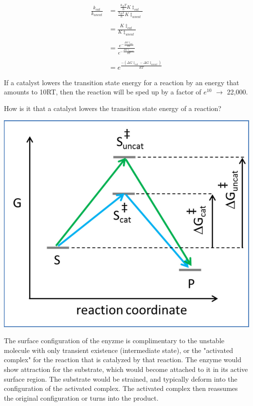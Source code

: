 \documentclass[12pt, letterpaper]{article}
\begin{document}
\begin{align*}
    \frac{k_{cat}}{k_{uncat}} &= \frac{\frac{k_BT}{h}K\ddagger_{cat}}{\frac{k_BT}{h}K\ddagger_{uncat}} \\ \\ 
    &= \frac{K\ddagger_{cat}}{K\ddagger_{uncat}} \\ \\ 
    &= \frac{e^{-\frac{\Delta G \ddagger_{cat}}{RT}}}{e^{-\frac{\Delta G \ddagger_{uncat}}{RT}}} \\ \\ 
    &= e^{\frac{-(\Delta G \ddagger_{cat} - \Delta G \ddagger_{uncat})}{RT}}
\end{align*}

If a catalyst lowers the transition state energy for a reaction by an energy that amounts to 10RT, then the reaction 
will be sped up by a factor of $e^{10}$ $\rightarrow$ 22,000. 

How is it that a catalyst lowers the transition state energy of a reaction? 
\begin{center}
    \includegraphics[scale = 0.5]{Catalysis .png}
\end{center}
\newpage


The surface configuration of the enyzme is complimentary to the unstable molecule with only transient existence (intermediate state), 
or the "activated complex" for the reaction that is catalyzed by that reaction. The enzyme would show attraction for the substrate, which 
would become attached to it in its active surface region. The substrate would be strained, and typically deform into the configuration of 
the activated complex. The activated complex then reassumes the original configuration or turns into the product. 
\end{document}
